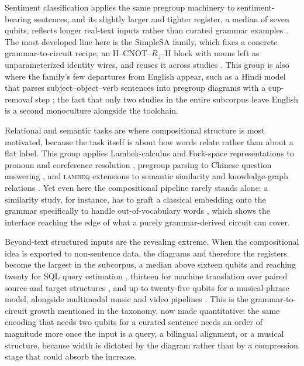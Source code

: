 \documentclass{ieeeaccess}
\begin{document}
Sentiment classification applies the same pregroup machinery to sentiment-bearing sentences, and its slightly larger and tighter register, a median of seven qubits, reflects longer real-text inputs rather than curated grammar examples \cite{ganguly_quantum_2022,ruskanda_quantum_2022,peral-garcia_using_2024,peral-garcia_comparing_2024}. The most developed line here is the SimpleSA family, which fixes a concrete grammar-to-circuit recipe, an H--CNOT--$R_z$--H block with nouns left as unparameterized identity wires, and reuses it across studies \cite{ruskanda_simple_2023,ruskanda_enhancing_2024}. This group is also where the family's few departures from English appear, such as a Hindi model that parses subject--object--verb sentences into pregroup diagrams with a cup-removal step \cite{naik_extending_2026}; the fact that only two studies in the entire subcorpus leave English is a second monoculture alongside the toolchain.

Relational and semantic tasks are where compositional structure is most motivated, because the task itself is about how words relate rather than about a flat label. This group applies Lambek-calculus and Fock-space representations to pronoun and coreference resolution \cite{wazni_large_2024,wazni_towards_2023}, pregroup parsing to Chinese question answering \cite{balthasar_mansky_adapting_2023}, and \textsc{lambeq} extensions to semantic similarity and knowledge-graph relations \cite{bharti_quantum_2025}. Yet even here the compositional pipeline rarely stands alone: a similarity study, for instance, has to graft a classical embedding onto the grammar specifically to handle out-of-vocabulary words \cite{bhatuse_resolving_2025}, which shows the interface reaching the edge of what a purely grammar-derived circuit can cover.

Beyond-text structured inputs are the revealing extreme. When the compositional idea is exported to non-sentence data, the diagrams and therefore the registers become the largest in the subcorpus, a median above sixteen qubits and reaching twenty for SQL query estimation \cite{uotila_sql2circuits_2025}, thirteen for machine translation over paired source and target structures \cite{abbaszadeh_hybrid_2026}, and up to twenty-five qubits for a musical-phrase model, alongside multimodal music and video pipelines \cite{hawashin_compositional_2025,r_quantum_2023}. This is the grammar-to-circuit growth mentioned in the taxonomy, now made quantitative: the same encoding that needs two qubits for a curated sentence needs an order of magnitude more once the input is a query, a bilingual alignment, or a musical structure, because width is dictated by the diagram rather than by a compression stage that could absorb the increase.
\end{document}
